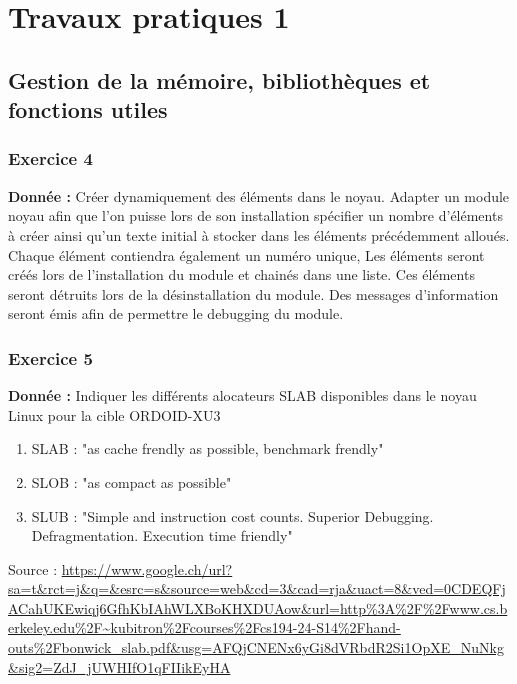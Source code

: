 \section{Travaux pratiques 1}
\subsection{Gestion de la mémoire, bibliothèques et fonctions utiles}
\subsubsection{Exercice 4}
\noindent
\textbf{Donnée : }Créer dynamiquement des éléments dans le noyau. Adapter un module noyau afin que l'on puisse lors de son installation spécifier un nombre d'éléments à créer ainsi qu'un texte initial à stocker dans les éléments précédemment alloués. Chaque élément contiendra également un numéro unique, Les éléments seront créés lors de l'installation du module et chainés dans une liste. Ces éléments seront détruits lors de la désinstallation du module. Des messages d'information seront émis afin de permettre le debugging du module.
\subsubsection{Exercice 5}
\noindent
\textbf{Donnée : }Indiquer les différents alocateurs SLAB disponibles dans le noyau Linux pour la cible ORDOID-XU3
\begin{enumerate}
	\item SLAB : "as cache frendly as possible, benchmark frendly"
	\item SLOB : "as compact as possible"
	\item SLUB : "Simple and instruction cost counts. Superior Debugging. Defragmentation. Execution time friendly"
\end{enumerate}
Source : \url{https://www.google.ch/url?sa=t&rct=j&q=&esrc=s&source=web&cd=3&cad=rja&uact=8&ved=0CDEQFjACahUKEwiqj6GfhKbIAhWLXBoKHXDUAow&url=http%3A%2F%2Fwww.cs.berkeley.edu%2F~kubitron%2Fcourses%2Fcs194-24-S14%2Fhand-outs%2Fbonwick_slab.pdf&usg=AFQjCNENx6yGi8dVRbdR2Si1OpXE_NuNkg&sig2=ZdJ_jUWHIfO1qFIIikEyHA}